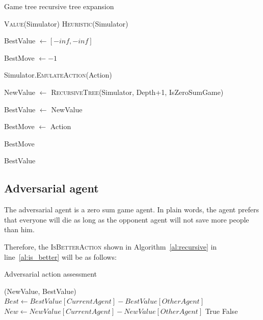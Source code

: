 \documentclass{article}                     %
\begin{document}
	\begin{algorithm}[H]
		\label{al:recursive}
		\caption{Game tree recursive tree expansion}
		\begin{algorithmic}[1]
	       \State \Return \textsc{Value}(Simulator)
	       \EndIf
	       \State \Return \textsc{Heuristic}(Simulator) \label{al:h}
			\EndIf
			
			\State BestValue $\longleftarrow  [-inf, -inf] $
			
			\State BestMove  $\longleftarrow -1 $
			
			\label{al:actions}
			
				\State Simulator.\textsc{EmulateAction}(Action)
				
				\State NewValue $ \leftarrow $ \textsc{RecursiveTree}(Simulator, Depth+1, IsZeroSumGame)
				
				 \label{al:is_better}
				
				\State BestValue $ \longleftarrow $ NewValue
				
				\State BestMove $ \longleftarrow $ Action
				\EndIf
				
				 \label{al:alphabeta}
				
				\EndIf
				
			\EndFor
			
			
				\Return BestMove
				
			\Else
			
				\Return BestValue
				
			\EndIf
			\EndProcedure
		\end{algorithmic}

	\end{algorithm}
			
	\subsection{Adversarial agent}
	The adversarial agent is a zero sum game agent. In plain words, the agent prefers that everyone will die as long as the opponent agent will not save more people than him.
	
	Therefore, the \textsc{IsBetterAction} shown in Algorithm~\ref{al:recursive} in line~\ref{al:is_better} will be as follows:
	\begin{algorithm}[H]
		\label{al:adv}
		\caption{Adversarial action assessment}
		\begin{algorithmic}[1]
			(NewValue, BestValue)
			\State $ Best \leftarrow BestValue[CurrentAgent] - BestValue[OtherAgent]$
			\State $ New \leftarrow NewValue[CurrentAgent] - NewValue[OtherAgent]  $
			\State  \Return True
			\Else   \Return False
			\EndIf
			\EndProcedure
		\end{algorithmic}
	\end{algorithm}
	
\end{document}
